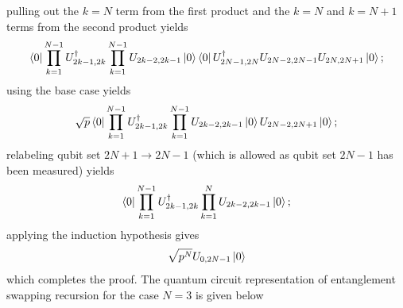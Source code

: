 \documentclass[Dual]{msu-thesis}
\begin{document}
pulling out the $k=N$ term from the first product and the $k=N$ and $k=N+1$ terms from the second product yields
\begin{align}
\bra{0}\prod_{k=1}^{N-1}U^\dagger_{2k-1,2k}\prod_{k=1}^{N-1}U_{2k-2,2k-1}\ket{0}
\bra{0}U^\dagger_{2N-1,2N}U_{2N-2,2N-1}U_{2N,2N+1}\ket{0};
\end{align}
using the base case yields
\begin{align}
\sqrt{p}
\bra{0}\prod_{k=1}^{N-1}U^\dagger_{2k-1,2k}\prod_{k=1}^{N-1}U_{2k-2,2k-1}\ket{0}
U_{2N-2,2N+1}\ket{0};
\end{align}
relabeling qubit set $2N+1\to2N-1$ (which is allowed as qubit set $2N-1$ has been measured) yields
\begin{align}
\bra{0}\prod_{k=1}^{N-1}U^\dagger_{2k-1,2k}\prod_{k=1}^{N}U_{2k-2,2k-1}\ket{0};
\end{align}
applying the induction hypothesis gives
\begin{align}
\sqrt{p^{N}}U_{0,2N-1}\ket{0}
\end{align}
which completes the proof. The quantum circuit representation of entanglement swapping recursion for the case $N=3$ is given below
\end{document}
